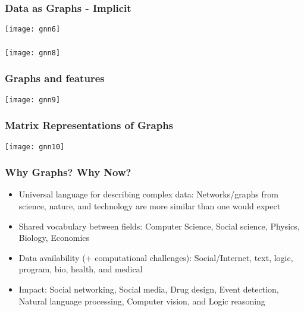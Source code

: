 \begin{frame}[fragile]\frametitle{Data as Graphs - Implicit }

\begin{center}
\texttt{[image: gnn6]}
\end{center}	  

\end{frame}



\begin{frame}[fragile]\frametitle{}

\begin{center}
\texttt{[image: gnn8]}
\end{center}	  

\end{frame}

\begin{frame}[fragile]\frametitle{Graphs and features}

\begin{center}
\texttt{[image: gnn9]}
\end{center}	  

\end{frame}

\begin{frame}[fragile]\frametitle{Matrix Representations of Graphs}

\begin{center}
\texttt{[image: gnn10]}
\end{center}	  

\end{frame}

\begin{frame}[fragile]\frametitle{Why Graphs? Why Now?}

\begin{itemize}
\item Universal language for describing complex data: Networks/graphs from science, nature, and technology are more similar than one would expect
\item Shared vocabulary between fields: Computer Science, Social science, Physics, Biology, Economics 
\item Data availability (+ computational challenges): Social/Internet, text, logic, program, bio, health, and medical
\item Impact: Social networking, Social media, Drug design, Event detection, Natural language processing, Computer vision, and Logic reasoning
\end{itemize}

\end{frame}

